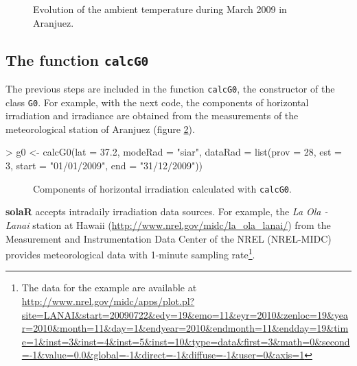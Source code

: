 \documentclass[a4paper]{article}
\renewenvironment{Schunk}{\vspace{\topsep}}{\vspace{\topsep}}
\newcommand{\code}[1]{{\texttt{#1}}}
\newcommand{\pkg}[1]{{\textbf{#1}}}
\begin{document}
%
\begin{figure}
\begin{centering}
\par\end{centering}
\caption{Evolution of the ambient temperature during March 2009 in Aranjuez.\label{fig:Ta}}
\end{figure}



\subsection[The function calcG0]{The function \code{calcG0}}
\label{sec:calcG0}
The previous steps are included in the function \code{calcG0}, the
constructor of the class \code{G0}. For example, with the next code,
the components of horizontal irradiation and irradiance are obtained
from the measurements of the meteorological station of Aranjuez
(figure \ref{fig:calcG0}).

\begin{Schunk}
\begin{Sinput}
> g0 <- calcG0(lat = 37.2, modeRad = "siar", dataRad = list(prov = 28, 
     est = 3, start = "01/01/2009", end = "31/12/2009"))
\end{Sinput}
\end{Schunk}

%
\begin{figure}
\begin{centering}
\par\end{centering}
\caption{Components of horizontal irradiation calculated with \code{calcG0}.\label{fig:calcG0}}
\end{figure}

\pkg{solaR} accepts intradaily irradiation data sources. For example, the \emph{La Ola - Lanai} station at Hawaii
(\url{http://www.nrel.gov/midc/la_ola_lanai/}) from the Measurement and Instrumentation Data Center of the NREL
(NREL-MIDC) provides meteorological data with 1-minute sampling rate\footnote{The data for
  the example are available at
  \url{http://www.nrel.gov/midc/apps/plot.pl?site=LANAI&start=20090722&edy=19&emo=11&eyr=2010&zenloc=19&year=2010&month=11&day=1&endyear=2010&endmonth=11&endday=19&time=1&inst=3&inst=4&inst=5&inst=10&type=data&first=3&math=0&second=-1&value=0.0&global=-1&direct=-1&diffuse=-1&user=0&axis=1}}.  
\end{document}
